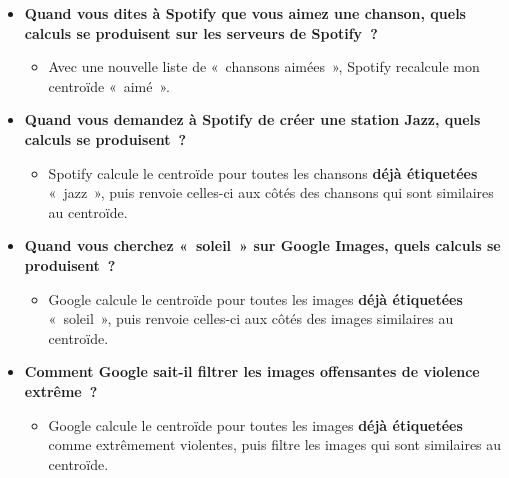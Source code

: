 \documentclass[12pt,a4paper]{article}
\begin{document}
\begin{thinkbox}
  \begin{itemize}
    \item \textbf{Quand vous dites à Spotify que vous aimez une chanson, quels calculs se produisent sur les serveurs de Spotify~?}
    \begin{itemize}
      \item Avec une nouvelle liste de «~chansons aimées~», Spotify recalcule mon centroïde «~aimé~».
    \end{itemize}
    \item \textbf{Quand vous demandez à Spotify de créer une station Jazz, quels calculs se produisent~?}
    \begin{itemize}
      \item Spotify calcule le centroïde pour toutes les chansons \textbf{déjà étiquetées} «~jazz~», puis renvoie celles-ci aux côtés des chansons qui sont similaires au centroïde.
    \end{itemize}
    \item \textbf{Quand vous cherchez «~soleil~» sur Google Images, quels calculs se produisent~?}
    \begin{itemize}
      \item Google calcule le centroïde pour toutes les images \textbf{déjà étiquetées} «~soleil~», puis renvoie celles-ci aux côtés des images similaires au centroïde.
    \end{itemize}
    \item \textbf{Comment Google sait-il filtrer les images offensantes de violence extrême~?}
    \begin{itemize}
      \item Google calcule le centroïde pour toutes les images \textbf{déjà étiquetées} comme extrêmement violentes, puis filtre les images qui sont similaires au centroïde.
    \end{itemize}
  \end{itemize}
\end{thinkbox}
\end{document}
